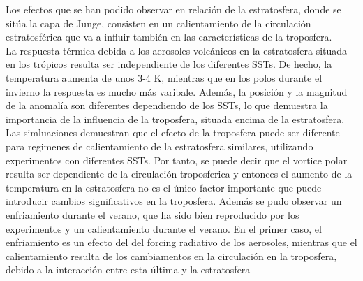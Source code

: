\documentclass[a4apaper,twocolumn,10pt]{article}
\begin{document}
Los efectos que se han podido observar en relaci\'on de la estratosfera, donde se sit\'ua la capa de Junge, consisten en un calientamiento de la circulaci\'on estratosf\'erica que va a influir tambi\'en en las caracter\'isticas de la troposfera. 
\\La respuesta t\'ermica debida a los aerosoles volc\'anicos en la estratosfera situada en los tr\'opicos resulta ser independiente de los diferentes SSTs. De hecho, la temperatura aumenta de unos 3-4 K, mientras que en los polos  durante el invierno la respuesta es mucho m\'as varibale. Adem\'as, la posici\'on y la magnitud de la anomal\'ia son diferentes dependiendo de los SSTs, lo que demuestra la importancia de la influencia de la troposfera, situada encima de la estratosfera. \\Las simluaciones demuestran que el efecto de la troposfera puede ser diferente para regimenes de calientamiento de la estratosfera similares, utilizando experimentos con diferentes SSTs. Por tanto, se puede decir que el vortice polar resulta ser dependiente de la circulaci\'on troposferica y entonces el aumento de la temperatura en la estratosfera no es el \'unico factor importante que puede introducir cambios significativos en la troposfera. 
Adem\'as se pudo observar un enfriamiento durante el verano, que ha sido bien reproducido por los experimentos y un calientamiento durante el verano. En el primer caso, el enfriamiento es un efecto del del forcing radiativo de los aerosoles, mientras que el calientamiento resulta de los cambiamentos en la circulaci\'on en la troposfera, debido a la interacci\'on entre esta \'ultima y la estratosfera 
\afterpage{\null\newpage}
\newpage


\end{document}
